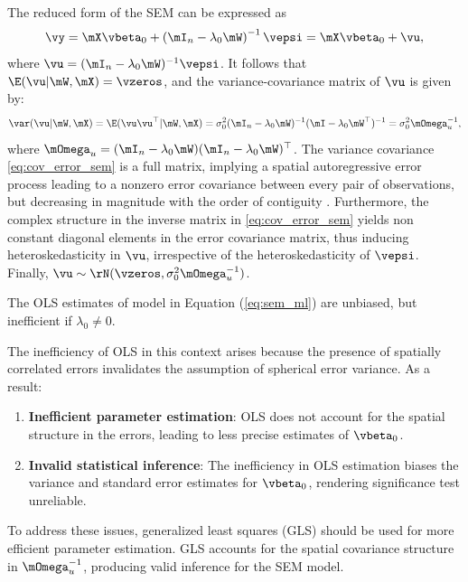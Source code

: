 \documentclass[english,12pt]{book}\usepackage[]{graphicx}\usepackage[]{xcolor}
\begin{document}
The reduced form of the SEM can be expressed as
\begin{equation*}
	\vy = \mX\vbeta_0 + \left(\mI_n-\lambda_0\mW\right)^{-1}\vepsi = \mX\vbeta_0 + \vu, 
\end{equation*}
%
where $\vu = (\mI_n - \lambda_0\mW)^{-1}\vepsi$. It follows that $\E(\vu| \mW, \mX) = \vzeros$, and the variance-covariance matrix of $\vu$ is given by: 
\begin{equation}\label{eq:cov_error_sem}
\var(\vu| \mW, \mX)=\E(\vu\vu^\top| \mW, \mX) = \sigma^2_0(\mI_n-\lambda_0\mW)^{-1}(\mI-\lambda_0\mW^\top)^{-1}=\sigma^2_0\mOmega_{u}^{-1},
\end{equation}
%
where $\mOmega_{u}=(\mI_n-\lambda_0\mW)(\mI_n-\lambda_0\mW)^\top$. The variance covariance \eqref{eq:cov_error_sem} is a full matrix, implying a spatial autoregressive error process leading to a nonzero error covariance between every pair of observations, but decreasing in magnitude with the order of contiguity \citep{AnselinBera1998}. Furthermore, the complex structure in the inverse matrix in \eqref{eq:cov_error_sem} yields non constant diagonal elements in the error covariance matrix, thus inducing heteroskedasticity in $\vu$, irrespective of the heteroskedasticity of $\vepsi$. Finally, $\vu \sim \rN(\vzeros, \sigma^2_0\mOmega_u^{-1})$.

\begin{remark}\label{remark:ols_sem}
  The OLS estimates of model in Equation (\ref{eq:sem_ml}) are unbiased, but inefficient if $\lambda_0 \neq 0$.
\end{remark}
The inefficiency of OLS in this context arises because the presence of spatially correlated errors invalidates the assumption of spherical error variance. As a result:
\begin{enumerate}
\item \textbf{Inefficient parameter estimation}: OLS does not account for the spatial structure in the errors, leading to less precise estimates of $\vbeta_0$.
\item \textbf{Invalid statistical inference}: The inefficiency in OLS estimation biases the variance and standard error estimates for $\vbeta_0$, rendering significance test unreliable.
\end{enumerate}

To address these issues, generalized least squares (GLS) should be used for more efficient parameter estimation. GLS accounts for the spatial covariance structure in $\mOmega_u^{-1}$, producing valid inference for the SEM model. 
\end{document}

